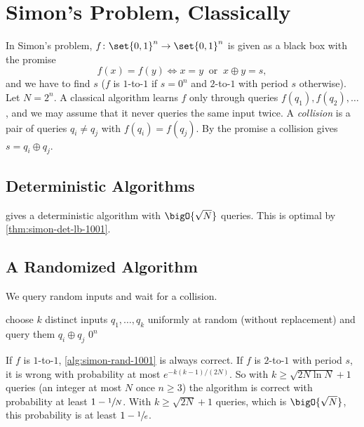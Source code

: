 
\section{Simon's Problem, Classically}

In Simon's problem, $f \colon \set{0,1}^n \to \set{0,1}^n$ is given as a black box with the promise
\[f(x) = f(y) \iff x = y \ \text{ or } \ x \oplus y = s,\]
and we have to find $s$ ($f$ is $1$-to-$1$ if $s = 0^n$ and $2$-to-$1$ with period $s$ otherwise).
Let $N = 2^n$. A classical algorithm learns $f$ only through queries $f(q_1), f(q_2), \dots$, and we
may assume that it never queries the same input twice. A \emph{collision} is a pair of queries
$q_i \neq q_j$ with $f(q_i) = f(q_j)$. By the promise a collision gives $s = q_i \oplus q_j$.

\subsection{Deterministic Algorithms}

 gives a deterministic algorithm with $\bigO{\sqrt{N}}$ queries. This is
optimal by \cref{thm:simon-det-lb-1001}.

\subsection{A Randomized Algorithm}

We query random inputs and wait for a collision.

\begin{algorithm}[ht]
    \caption{Randomized classical algorithm for Simon's problem}
    \label{alg:simon-rand-1001}
    \begin{algorithmic}[1]
        \State choose $k$ distinct inputs $q_1, \dots, q_k$ uniformly at random (without replacement) and query them
        \State \Return $q_i \oplus q_j$
        \Else
        \State \Return $0^n$
        \EndIf
    \end{algorithmic}
\end{algorithm}

\begin{theorem}\label{thm:simon-rand-ub-1001}
    If $f$ is $1$-to-$1$, \cref{alg:simon-rand-1001} is always correct. If $f$ is $2$-to-$1$ with period
    $s$, it is wrong with probability at most $e^{-k(k-1)/(2N)}$. So with
    $k \geq \sqrt{2N \ln N} + 1$ queries (an integer at most $N$ once $n \geq 3$) the algorithm is correct
    with probability at least $1 - \sfrac{1}{N}$. With $k \geq \sqrt{2N} + 1$ queries, which is
    $\bigO{\sqrt{N}}$, this probability is at least $1 - \sfrac{1}{e}$.
\end{theorem}

